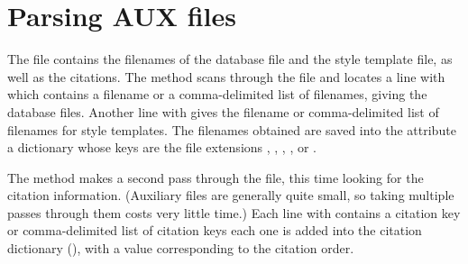 \documentclass[letterpaper,10pt,english]{sphinxmanual}
\begin{document}
\section{Parsing AUX files}
\label{\detokenize{developer_guide:parsing-aux-files}}
The  file contains the filenames of the  database file and the  style template file, as well as the citations. The  method scans through the  file and locates a line with  which contains a filename or a comma-delimited list of filenames, giving the database files. Another line with  gives the filename or comma-delimited list of filenames for style templates. The filenames obtained are saved into the  attribute \textendash{} a dictionary whose keys are the file extensions , , , , or .

The  method makes a second pass through the  file, this time looking for the citation information. (Auxiliary files are generally quite small, so taking multiple passes through them costs very little time.) Each line with  contains a citation key or comma-delimited list of citation keys \textendash{} each one is added into the citation dictionary (), with a value corresponding to the citation order.
\end{document}
